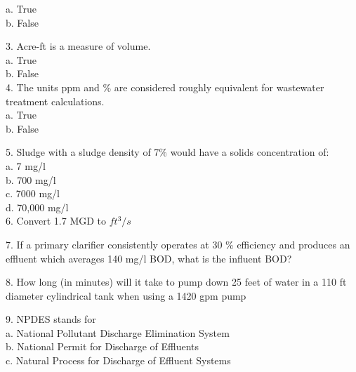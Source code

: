 a. True \\
b. False \\
\vspace{0.3cm}

3. Acre-ft is a measure of volume.\\

a. True \\
b. False \\

\vspace{0.3cm}
4. The units ppm and \% are considered roughly equivalent for wastewater treatment calculations.\\
\vspace{0.3cm}
a. True \\
b. False \\
\vspace{0.3cm}

5. Sludge with a sludge density of 7\% would have a solids concentration of:\\

a. 7 mg/l \\
b. 700 mg/l \\
c. 7000 mg/l \\
d. 70,000 mg/l \\

\vspace{0.3cm}
6. Convert 1.7 MGD to $ft^3/s$
\vspace{0.3cm}


7. If a primary clarifier consistently operates at 30 \% efficiency and produces an effluent which averages 140 mg/l BOD, what is the influent BOD?\\
\vspace{0.3cm}


8. How long (in minutes) will it take to pump down 25 feet of water in a 110 ft diameter cylindrical tank when using a 1420 gpm pump\\

\vspace{0.3cm}

9. NPDES stands for\\

a. National Pollutant Discharge Elimination System \\
b. National Permit for Discharge of Effluents \\
c. Natural Process for Discharge of Effluent Systems \\

\vspace{0.3cm}
\vspace{26cm}

